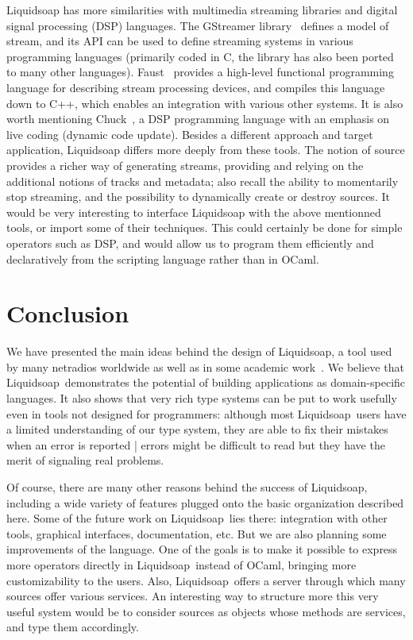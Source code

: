 \documentclass{llncs}
\newcommand{\liquidsoap}{Liquidsoap}
\begin{document}
\liquidsoap{} has more similarities with multimedia streaming libraries
and digital signal processing (DSP) languages.
The GStreamer library~\cite{gstreamer} defines a model of stream, and its API
can be used to define streaming systems in various programming
languages (primarily coded in C, the library has also been
ported to many other languages).
Faust~\cite{faust} provides a high-level functional programming language for
describing stream processing devices,
and compiles this language down to C++, which enables an integration
with various other systems.
It is also worth mentioning Chuck~\cite{chuck}, a DSP programming
language with an emphasis on live coding (dynamic code update).
Besides a different approach and target application,
\liquidsoap{} differs more deeply from these tools.
The notion of source provides a richer way of
generating streams, providing and relying on the additional notions
of tracks and metadata; also recall the ability to momentarily
stop streaming, and the possibility to dynamically create or
destroy sources.
It would be very interesting to interface \liquidsoap{} with the
above mentionned tools, or import some of their techniques.
This could certainly be done for simple operators such as DSP,
and would allow us to program them efficiently and declaratively
from the scripting language rather than in OCaml.

\section{Conclusion} \label{sec:conclu}

We have presented the main ideas behind the design of \liquidsoap,
a tool used by many netradios worldwide as well as in some academic 
work~\cite{baccigalupo2007case}.
We believe that \liquidsoap\ demonstrates the potential of
building applications as domain-specific languages.
It also shows that very rich type systems can be put to work
usefully even in tools not designed for programmers:
although most \liquidsoap\ users have a limited understanding of
our type system, they are able to fix their mistakes
when an error is reported | errors might be difficult to read but
they have the merit of signaling real problems.

Of course, there are many other reasons behind the success of \liquidsoap,
including a wide variety of features plugged onto the basic organization
described here. %
Some of the future work on \liquidsoap\ lies there:
integration with other tools, graphical interfaces, documentation, etc.
But we are also planning some improvements of the language.
One of the goals is to make it possible to express more operators
directly in \liquidsoap\ instead of OCaml,
bringing more customizability to the users.
Also, \liquidsoap\ offers a server through which many sources
offer various services. An interesting way to structure more this very useful
system would be to consider sources as objects whose methods are services,
and type them accordingly.



\end{document}
